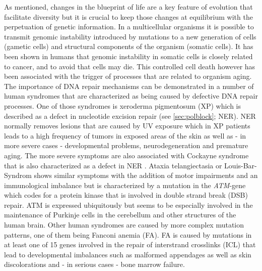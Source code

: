 As mentioned, changes in the blueprint of life are a key feature of evolution that facilitate diversity but it is crucial to keep those changes at equilibrium with the perpetuation of genetic information. In a multicellular organisms it is possible to transmit genomic instability introduced by mutations to a new generation of cells (gametic cells) and structural components of the organism (somatic cells). It has been shown in humans that genomic instability in somatic cells is closely related to cancer, and to avoid that cells may die. This controlled cell death however has been associated with the trigger of processes that are related to organism aging. The importance of DNA repair mechanisms can be demonstrated in a number of human syndromes that are characterized as being caused by defective DNA repair processes. One of those syndromes is xeroderma pigmentosum (XP) which is described as a defect in nucleotide excision repair (see \ref{sec:polblock}; NER). NER normally removes lesions that are caused by UV exposure which in XP patients leads to a high frequency of tumors in exposed areas of the skin as well as - in more severe cases - developmental problems, neurodegeneration and premature aging. The more severe symptoms are also associated with Cockayne syndrome that is also characterized as a defect in NER \citep{Menck.2014}.  Ataxia telangiectasia or Louis-Bar-Syndrom shows similar symptoms with the addition of motor impairments and an immunological imbalance but is characterized by a mutation in the \textit{ATM}-gene which codes for a protein kinase that is involved in double strand break (DSB) repair. ATM is expressed ubiquitously but seems to be especially involved in the maintenance of Purkinje cells in the cerebellum and other structures of the human brain.  Other human syndromes are caused by more complex mutation patterns, one of them being Fanconi anemia (FA). FA is caused by mutations in at least one of 15 genes involved in the repair of interstrand crosslinks (ICL) that lead to developmental imbalances such as malformed appendages as well as skin discolorations and - in serious cases - bone marrow failure.\\\\
